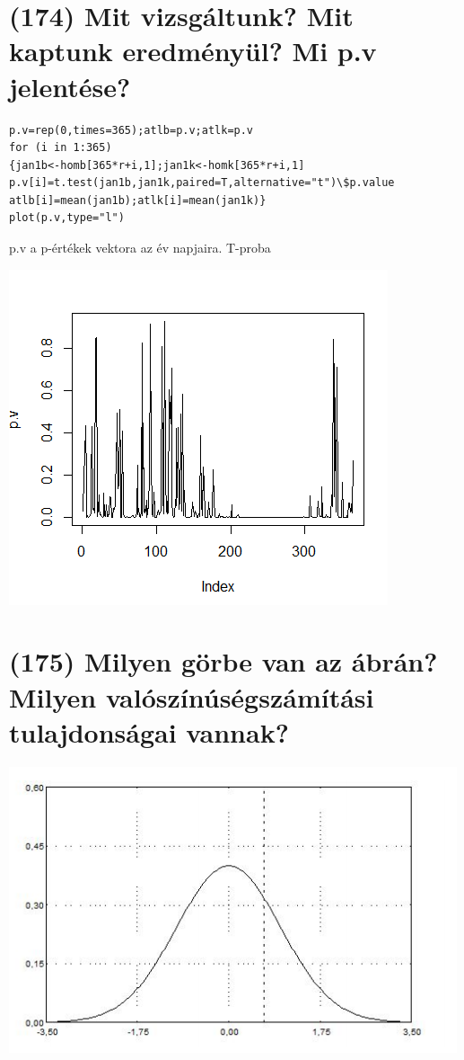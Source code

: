 \documentclass[12p]{article}
\begin{document}
\section{(174)  Mit vizsgáltunk? Mit kaptunk eredményül? Mi p.v jelentése?}

\begin{verbatim}
p.v=rep(0,times=365);atlb=p.v;atlk=p.v
for (i in 1:365)
{jan1b<-homb[365*r+i,1];jan1k<-homk[365*r+i,1]
p.v[i]=t.test(jan1b,jan1k,paired=T,alternative="t")\$p.value
atlb[i]=mean(jan1b);atlk[i]=mean(jan1k)}
plot(p.v,type="l")
\end{verbatim}

p.v a p-értékek vektora az év napjaira. T-proba

\includegraphics{pv}

\section{(175) Milyen görbe van az ábrán? Milyen valószínúségszámítási tulajdonságai vannak?}

\includegraphics{gorbe}
\end{document}
